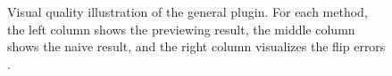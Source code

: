 \documentclass[letterpaper]{article}
\begin{document}
\begin{figure}[htbp]
  \centering
  \caption{Visual quality illustration of the general plugin. For each method, the left column shows the previewing result, the middle column shows the naive result, and the right column visualizes the flip errors \cite{Andersson2020}.}
  \label{fig:3based}
\end{figure}
\end{document}
